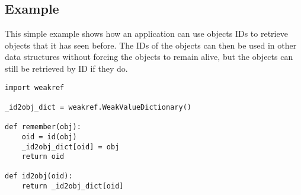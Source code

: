 \subsection{Example \label{weakref-example}}

This simple example shows how an application can use objects IDs to
retrieve objects that it has seen before.  The IDs of the objects can
then be used in other data structures without forcing the objects to
remain alive, but the objects can still be retrieved by ID if they
do.

\begin{verbatim}
import weakref

_id2obj_dict = weakref.WeakValueDictionary()

def remember(obj):
    oid = id(obj)
    _id2obj_dict[oid] = obj
    return oid

def id2obj(oid):
    return _id2obj_dict[oid]
\end{verbatim}
